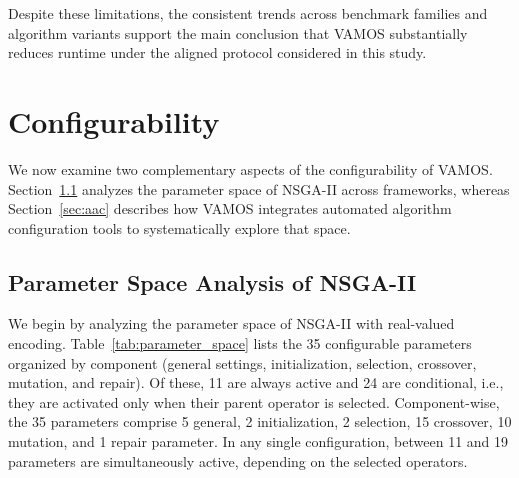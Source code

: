 \documentclass[journal]{IEEEtran}
\newcommand{\VAMOS}{VAMOS}
\begin{document}
Despite these limitations, the consistent trends across benchmark families and algorithm variants support the main conclusion that \VAMOS{} substantially reduces runtime under the aligned protocol considered in this study.

\section{Configurability}
\label{sec:configurability}
We now examine two complementary aspects of the configurability of \VAMOS{}. Section~\ref{sec:parameter_space} analyzes the parameter space of NSGA-II across frameworks, whereas Section~\ref{sec:aac} describes how \VAMOS{} integrates automated algorithm configuration tools to systematically explore that space.

\subsection{Parameter Space Analysis of NSGA-II}
\label{sec:parameter_space}
We begin by analyzing the parameter space of NSGA-II with real-valued encoding. Table~\ref{tab:parameter_space} lists the 35 configurable parameters organized by component (general settings, initialization, selection, crossover, mutation, and repair). Of these, 11 are always active and 24 are conditional, i.e., they are activated only when their parent operator is selected. Component-wise, the 35 parameters comprise 5 general, 2 initialization, 2 selection, 15 crossover, 10 mutation, and 1 repair parameter. In any single configuration, between 11 and 19 parameters are simultaneously active, depending on the selected operators.
\end{document}
